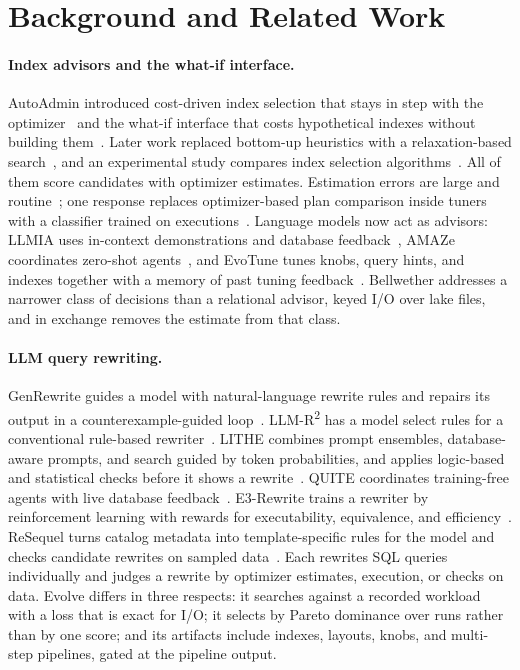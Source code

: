 \section{Background and Related Work}\label{sec:related}

\paragraph{Index advisors and the what-if interface.} AutoAdmin introduced
cost-driven index selection that stays in step with the
optimizer~\cite{autoadmin1997} and the what-if interface that costs hypothetical
indexes without building them~\cite{whatif1998}. Later work replaced bottom-up
heuristics with a relaxation-based search~\cite{bruno2005relax}, and an
experimental study compares index selection algorithms~\cite{kossmann2020}. All of them score candidates with optimizer
estimates. Estimation errors are large and routine~\cite{leis2015}; one
response replaces optimizer-based plan comparison inside tuners with a
classifier trained on executions~\cite{aimeetsai}. Language models now act as
advisors: LLMIA uses in-context demonstrations and database
feedback~\cite{llmia}, AMAZe coordinates zero-shot agents~\cite{amaze}, and
EvoTune tunes knobs, query hints, and indexes together with a memory of past
tuning feedback~\cite{memtuning}. Bellwether addresses a narrower class of
decisions than a relational advisor, keyed I/O over lake files, and in exchange
removes the estimate from that class.

\paragraph{LLM query rewriting.} GenRewrite guides a model with natural-language
rewrite rules and repairs its output in a counterexample-guided
loop~\cite{genrewrite}. LLM-R\textsuperscript{2} has a model select rules for
a conventional rule-based rewriter~\cite{llmr2}. LITHE combines prompt
ensembles, database-aware prompts, and search guided by token probabilities,
and applies logic-based and statistical checks before it shows a
rewrite~\cite{lithe}. QUITE coordinates training-free agents with live database
feedback~\cite{quite}. E3-Rewrite trains a rewriter by reinforcement learning
with rewards for executability, equivalence, and efficiency~\cite{e3rewrite}.
ReSequel turns catalog metadata into template-specific rules for the model and
checks candidate rewrites on sampled data~\cite{resequel}. Each rewrites SQL
queries individually and judges a rewrite by optimizer estimates, execution, or
checks on data. Evolve differs in three respects: it searches against a
recorded workload with a loss that is exact for I/O; it selects by Pareto
dominance over runs rather than by one score; and its artifacts include
indexes, layouts, knobs, and multi-step pipelines, gated at the pipeline output.

